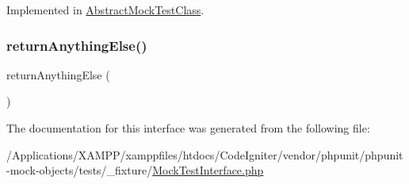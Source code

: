 Implemented in \mbox{\hyperlink{class_abstract_mock_test_class_a92fcad527108f0c33114b9b5efcf54f2}{Abstract\+Mock\+Test\+Class}}.

\mbox{\label{interface_mock_test_interface_aa111c1d8db9d090bddaeb28f48abf3a5}} 
\subsubsection{\texorpdfstring{return\+Anything\+Else()}{returnAnythingElse()}}
{\footnotesize\ttfamily return\+Anything\+Else (\begin{DoxyParamCaption}{ }\end{DoxyParamCaption})}



The documentation for this interface was generated from the following file\+:\begin{DoxyCompactItemize}
\item 
/\+Applications/\+X\+A\+M\+P\+P/xamppfiles/htdocs/\+Code\+Igniter/vendor/phpunit/phpunit-\/mock-\/objects/tests/\+\_\+fixture/\mbox{\hyperlink{_mock_test_interface_8php}{Mock\+Test\+Interface.\+php}}\end{DoxyCompactItemize}
